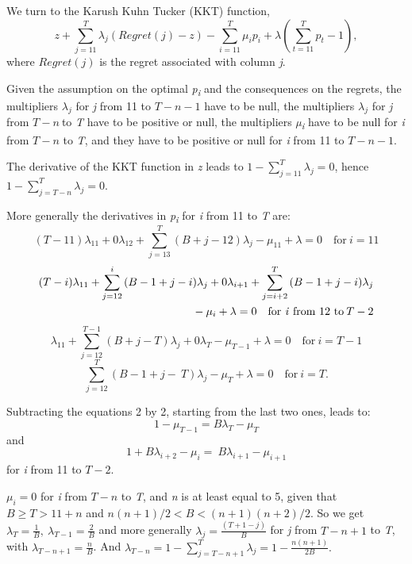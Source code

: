 \begin{Article}
\begin{refsection}[Umbhauer]
\begin{appendices}
We turn to the Karush Kuhn Tucker (KKT) function,
\[z + \sum_{j = 11}^{T}{\lambda_{j}(Regret(j) - z)} - \sum_{i = 11}^{T}{\mu_{i}p_{i} + \lambda\left( \sum_{t = 11}^{T}p_{t} - 1 \right)},\]
where $Regret(j)$ is the regret associated with column \emph{j}.

Given the assumption on the optimal \emph{p\textsubscript{i}} and the
consequences on the regrets, the multipliers \(\lambda_{j}\) for
\emph{j} from 11 to \(T - n - 1\) have to be null, the multipliers
\(\lambda_{j}\) for \emph{j} from \(T - n\ \)to \emph{T} have to be
positive or null, the multipliers \emph{µ\textsubscript{i}} have to be
null for \emph{i} from \(T - n\) to \emph{T}, and they have to be
positive or null for \emph{i} from 11 to \(T - n - 1\).

The derivative of the KKT function in \emph{z} leads to \(1 - \sum_{j = 11}^{T}\lambda_{j} = 0\), hence \(1 - \sum_{j = T - n}^{T}\lambda_{j} = 0\).

More generally the derivatives in \emph{p\textsubscript{i}} for \emph{i}
from 11 to \emph{T} are:
\[
(T - 11)\lambda_{11} + 0\lambda_{12} + \sum_{j = 13}^{T}{(B + j - 12)\lambda_{j}} - \mu_{11} + \lambda = 0
\quad \text{for} \: i = 11
\]
\begin{equation*}
\begin{split}
(T - i)\lambda_{11} + \sum_{j = 12}^{i}{(B - 1 + j - i)\lambda_{j} + 0\lambda_{i + 1} + \sum_{j = i + 2}^{T}{(B - 1 + j - i)\lambda_{j}}}\\
{-\: \mu_{i} + \lambda = 0} \quad \text{for \emph{i} from 12 to} \: T - 2  
\end{split}
\end{equation*}
\[
\lambda_{11} + \sum_{j = 12}^{T - 1}{(B + j - T)\lambda_{j} + 0\lambda_{T} - \mu_{T - 1} + \lambda = 0} \quad \text{for} \: i = T - 1
\]
\[
\sum_{j = 12}^{T}{(B - 1 + j - \ T)\lambda_{j} - \mu_{T} + \lambda = 0}
\quad \text{for} \: i = T.
\]

Subtracting the equations 2 by 2, starting from the last two ones, leads
to:
\[1 - \mu_{T - 1} = B\lambda_{T} - \mu_{T}\]
\noindent and
\[1 + B\lambda_{i + 2} - \mu_{i} = \ B\lambda_{i + 1} - \mu_{i + 1}\]
for \emph{i} from 11 to \(T - 2\).

$\mu_i = 0$ for \emph{i} from \(T - n\) to \emph{T}, and
\emph{n} is at least equal to 5, given that \(B \geq T > 11 + n\) and
\(n(n + 1)/2 < B < (n + 1)(n + 2)/2\). So we get
\(\lambda_{T} = \frac{1}{B},\ \lambda_{T - 1} = \frac{2}{B}\) and more
generally \(\lambda_{j} = \frac{(T + 1 - j)}{B}\) for \emph{j} from
\(T - n + 1\) to \emph{T}, with \(\lambda_{T - n + 1} = \frac{n}{B}\).
And
\(\lambda_{T - n} = 1 - \sum_{j = T - n + 1}^{T}\lambda_{j}{= 1 - \frac{n(n + 1)}{2B}.}_{}\)


\end{appendices}
\end{refsection}
\end{Article}
